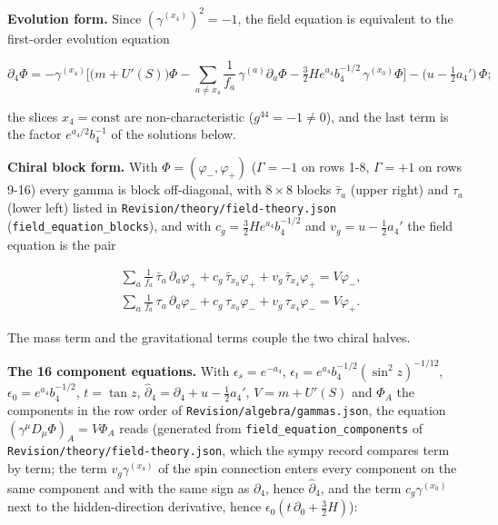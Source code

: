 \documentclass[11pt]{article}
\begin{document}
\textbf{Evolution form.} Since $(\gamma^{(x_4)})^2 = -1$, the field equation is equivalent to the first-order evolution equation

\[
\partial_4\Phi = -\gamma^{(x_4)}\Big[\big(m + U'(S)\big)\Phi - \sum_{a \ne x_4}\frac{1}{f_a}\,\gamma^{(a)}\partial_a\Phi - \tfrac32He^{a_4}b_4^{-1/2}\,\gamma^{(x_0)}\Phi\Big] - \big(u - \tfrac12a_4'\big)\,\Phi ;
\]

the slices $x_4 = \mathrm{const}$ are non-characteristic ($g^{44} = -1 \ne 0$), and the last term is the factor $e^{a_4/2}b_4^{-1}$ of the solutions below.

\textbf{Chiral block form.} With $\Phi = (\varphi_-, \varphi_+)$ ($\Gamma = -1$ on rows 1-8, $\Gamma = +1$ on rows 9-16) every gamma is block off-diagonal, with $8\times8$ blocks $\bar\tau_a$ (upper right) and $\tau_a$ (lower left) listed in \texttt{Revision\allowbreak{}/theory/\allowbreak{}field-th\allowbreak{}eory.jso\allowbreak{}n} (\texttt{field\_eq\allowbreak{}uation\_b\allowbreak{}locks}), and with $c_g = \tfrac32He^{a_4}b_4^{-1/2}$ and $v_g = u - \tfrac12a_4'$ the field equation is the pair

\[
\begin{aligned}
& \sum_a \frac{1}{f_a}\,\bar\tau_a\,\partial_a\varphi_+ + c_g\,\bar\tau_{x_0}\varphi_+ + v_g\,\bar\tau_{x_4}\varphi_+ = V\varphi_-, \\
& \sum_a \frac{1}{f_a}\,\tau_a\,\partial_a\varphi_- + c_g\,\tau_{x_0}\varphi_- + v_g\,\tau_{x_4}\varphi_- = V\varphi_+ .
\end{aligned}
\]

The mass term and the gravitational terms couple the two chiral halves.

\textbf{The 16 component equations.} With $\epsilon_s = e^{-a_4}$, $\epsilon_t = e^{a_4}b_4^{-1/2}(\sin^2 z)^{-1/12}$, $\epsilon_0 = e^{a_4}b_4^{-1/2}$, $t = \tan z$, $\hat\partial_4 = \partial_4 + u - \tfrac12a_4'$, $V = m + U'(S)$ and $\Phi_A$ the components in the row order of \texttt{Revision\allowbreak{}/algebra\allowbreak{}/gammas.\allowbreak{}json}, the equation $(\gamma^\mu D_\mu\Phi)_A = V\Phi_A$ reads (generated from \texttt{field\_eq\allowbreak{}uation\_c\allowbreak{}omponent\allowbreak{}s} of \texttt{Revision\allowbreak{}/theory/\allowbreak{}field-th\allowbreak{}eory.jso\allowbreak{}n}, which the sympy record compares term by term; the term $v_g\gamma^{(x_4)}$ of the spin connection enters every component on the same component and with the same sign as $\partial_4$, hence $\hat\partial_4$, and the term $c_g\gamma^{(x_0)}$ next to the hidden-direction derivative, hence $\epsilon_0(t\,\partial_0 + \tfrac32H)$):
\end{document}
